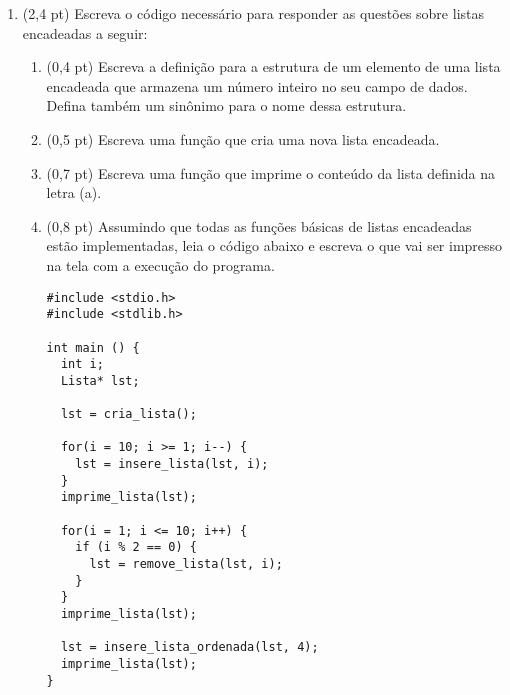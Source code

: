 \documentclass[a4paper,10pt]{article}
\begin{document}
\begin{multicols*}{2}
\begin{enumerate}
  \vfill\null
  \columnbreak

  \item (2,4 pt) Escreva o código necessário para responder as questões sobre listas encadeadas a seguir:

  \begin{enumerate}
    \item (0,4 pt) Escreva a definição para a estrutura de um elemento de uma lista encadeada que armazena um número inteiro no seu campo de dados. Defina também um sinônimo para o nome dessa estrutura.
    \item (0,5 pt) Escreva uma função que cria uma nova lista encadeada.
    \item (0,7 pt) Escreva uma função que imprime o conteúdo da lista definida na letra (a).
    \item (0,8 pt) Assumindo que todas as funções básicas de listas encadeadas estão implementadas, leia o código abaixo e escreva o que vai ser impresso na tela com a execução do programa.

    \begin{verbatim}
#include <stdio.h>
#include <stdlib.h>

int main () {
  int i;
  Lista* lst;

  lst = cria_lista();

  for(i = 10; i >= 1; i--) {
    lst = insere_lista(lst, i);
  }
  imprime_lista(lst);

  for(i = 1; i <= 10; i++) {
    if (i % 2 == 0) {
      lst = remove_lista(lst, i);
    }
  }
  imprime_lista(lst);

  lst = insere_lista_ordenada(lst, 4);
  imprime_lista(lst);
}
    \end{verbatim}
  \end{enumerate}
\end{enumerate}
\end{multicols*}
\end{document}
